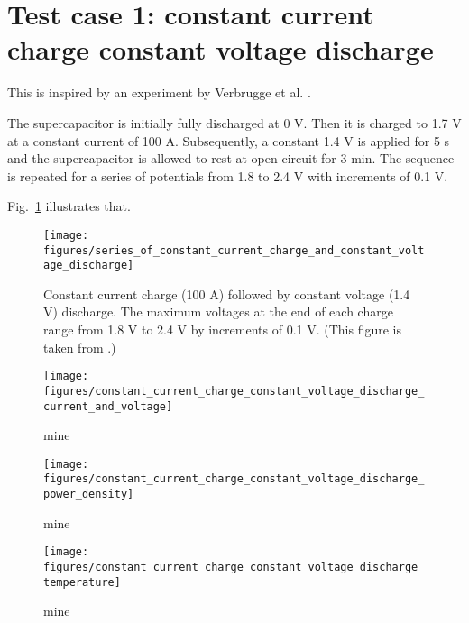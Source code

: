 \documentclass[10pt, oneside]{article}   	%
\begin{document}
\newpage
\section{Test case 1: constant current charge constant voltage discharge}
This is inspired by an experiment by Verbrugge et al. \cite{Verbrugge2005}.

The supercapacitor is initially fully discharged at 0 V.  Then it is charged
to 1.7 V at a constant current of 100 A.  Subsequently, a constant 1.4 V is
applied for 5 s and the supercapacitor is allowed to rest at open circuit for
3 min.  The sequence is repeated for a series of potentials from 1.8 to 2.4 V
with increments of 0.1 V.

Fig.~\ref{fig:series_of_constant_current_charge_and_constant_voltage_discharge}
illustrates that.


\begin{figure}[h!]
    \centering
    \texttt{[image: figures/series\_of\_constant\_current\_charge\_and\_constant\_voltage\_discharge]}
    \caption{
Constant current charge (100 A) followed by constant voltage (1.4 V)
discharge.  The maximum voltages at the end of each charge range from 1.8 V to
2.4 V by increments of 0.1 V.  (This figure is taken from \cite{Verbrugge2005}.)
    }
    \label{fig:series_of_constant_current_charge_and_constant_voltage_discharge}
\end{figure}

\begin{figure}[h!]
    \centering
    \texttt{[image: figures/constant\_current\_charge\_constant\_voltage\_discharge\_current\_and\_voltage]}
    \caption{mine}
    \label{fig:constant_current_charge_constant_voltage_discharge_current_and_voltage}
\end{figure}

\begin{figure}[h!]
    \centering
    \texttt{[image: figures/constant\_current\_charge\_constant\_voltage\_discharge\_power\_density]}
    \caption{mine}
    \label{fig:constant_current_charge_constant_voltage_discharge_current_and_voltage}
\end{figure}

\begin{figure}[h!]
    \centering
    \texttt{[image: figures/constant\_current\_charge\_constant\_voltage\_discharge\_temperature]}
    \caption{mine}
    \label{fig:constant_current_charge_constant_voltage_discharge_temperature}
\end{figure}
\end{document}
